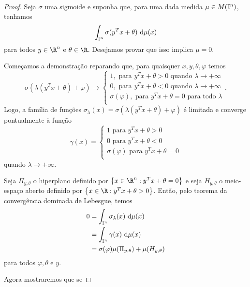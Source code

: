 \begin{proof}
    Seja \( \sigma \) uma sigmoide e suponha que, para uma dada medida \( \mu \in M(\mathbb{I}^{ n }) \), tenhamos \[
        \int_{ \I^{ n } } \sigma(y^{ T }x + \theta) \ \mathrm{d}\mu(x)
    \]
    para todos \( y \in \R^{ n } \) e \( \theta \in \R \).
    Desejamos provar que isso implica \( \mu = 0 \).

    Começamos a demonstração reparando que, para quaisquer \( x, y, \theta, \varphi \) temos \[
        \sigma(\lambda(y^{ T }x + \theta) + \varphi)
        \to
        \begin{cases}
            1, \text{ para } y^{ T }x + \theta > 0 \text{ quando } \lambda \to +\infty \\
            0, \text{ para } y^{ T }x + \theta < 0 \text{ quando } \lambda \to +\infty \\
            \sigma(\varphi), \text{ para } y^{ T }x + \theta = 0 \text{ para todo } \lambda \\
        \end{cases}
    .\]
    Logo, a família de funções \( \sigma_{ \lambda }(x) = \sigma(\lambda(y^{ T }x + \theta) + \varphi) \) é limitada e converge pontualmente à função \[
        \gamma(x) =
        \begin{cases}
            1 \text{ para } y^{ T }x + \theta > 0 \\
            0 \text{ para } y^{ T }x + \theta < 0 \\
            \sigma(\varphi) \text{ para } y^{ T }x + \theta = 0 \\
        \end{cases}
    \]
    quando \( \lambda \to +\infty \).

    Seja \( \Pi_{ y, \theta } \) o hiperplano definido por \( \left\{ x \in \R^{ n } : y^{ T }x + \theta = 0 \right\} \) e seja \( H_{ y, \theta } \) o meio-espaço aberto definido por \( \left\{ x \in \R : y^{ T }x + \theta > 0 \right\} \).
    Então, pelo teorema da convergência dominada de Lebesgue, temos %
    \begin{align*}
        0 &=
        \int_{ \mathbb{I}^{ n } } \sigma_{ \lambda }(x)  \ \mathrm{d}\mu(x) \\
        &= \int_{ \mathbb{I}^{ n } } \gamma(x) \ \mathrm{d}\mu(x) \\
        &= \sigma(\varphi)\mu(\Pi_{ y, \theta }) + \mu(H_{ y, \theta })
    \end{align*}
    para todos \( \varphi, \theta \) e \( y \).

    Agora mostraremos que se 
\end{proof}


